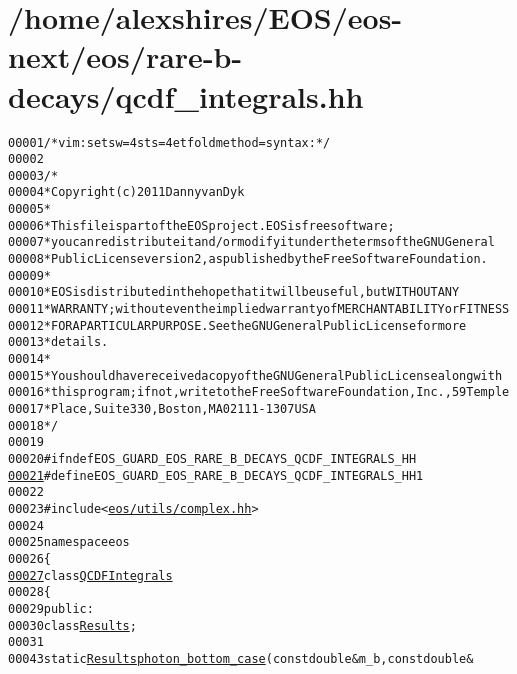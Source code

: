 \hypertarget{qcdf__integrals_8hh_source}{
\section{/home/alexshires/EOS/eos-\/next/eos/rare-\/b-\/decays/qcdf\_\-integrals.hh}
}


\begin{footnotesize}\begin{alltt}
00001 \textcolor{comment}{/* vim: set sw=4 sts=4 et foldmethod=syntax : */}
00002 
00003 \textcolor{comment}{/*}
00004 \textcolor{comment}{ * Copyright (c) 2011 Danny van Dyk}
00005 \textcolor{comment}{ *}
00006 \textcolor{comment}{ * This file is part of the EOS project. EOS is free software;}
00007 \textcolor{comment}{ * you can redistribute it and/or modify it under the terms of the GNU General}
00008 \textcolor{comment}{ * Public License version 2, as published by the Free Software Foundation.}
00009 \textcolor{comment}{ *}
00010 \textcolor{comment}{ * EOS is distributed in the hope that it will be useful, but WITHOUT ANY}
00011 \textcolor{comment}{ * WARRANTY; without even the implied warranty of MERCHANTABILITY or FITNESS}
00012 \textcolor{comment}{ * FOR A PARTICULAR PURPOSE.  See the GNU General Public License for more}
00013 \textcolor{comment}{ * details.}
00014 \textcolor{comment}{ *}
00015 \textcolor{comment}{ * You should have received a copy of the GNU General Public License along with}
00016 \textcolor{comment}{ * this program; if not, write to the Free Software Foundation, Inc., 59 Temple}
00017 \textcolor{comment}{ * Place, Suite 330, Boston, MA  02111-1307  USA}
00018 \textcolor{comment}{ */}
00019 
00020 \textcolor{preprocessor}{#ifndef EOS\_GUARD\_EOS\_RARE\_B\_DECAYS\_QCDF\_INTEGRALS\_HH}
\hypertarget{qcdf__integrals_8hh_source_l00021}{}\hyperlink{qcdf__integrals_8hh_a22714b9eea2c1c4f506ea9b45a76f43a}{00021} \textcolor{preprocessor}{}\textcolor{preprocessor}{#define EOS\_GUARD\_EOS\_RARE\_B\_DECAYS\_QCDF\_INTEGRALS\_HH 1}
00022 \textcolor{preprocessor}{}
00023 \textcolor{preprocessor}{#include <\hyperlink{complex_8hh}{eos/utils/complex.hh}>}
00024 
00025 \textcolor{keyword}{namespace }eos
00026 \{
\hypertarget{qcdf__integrals_8hh_source_l00027}{}\hyperlink{classeos_1_1QCDFIntegrals}{00027}     \textcolor{keyword}{class }\hyperlink{classeos_1_1QCDFIntegrals}{QCDFIntegrals}
00028     \{
00029         \textcolor{keyword}{public}:
00030             \textcolor{keyword}{class }\hyperlink{structeos_1_1QCDFIntegrals_1_1Results}{Results};
00031 
00043             \textcolor{keyword}{static} \hyperlink{structeos_1_1QCDFIntegrals_1_1Results}{Results} \hyperlink{classeos_1_1QCDFIntegrals_af6508bca0f6425fcefc36a75699fd505}{photon_bottom_case}(\textcolor{keyword}{const} \textcolor{keywordtype}{double} & m\_b, \textcolor{keyword}{const} \textcolor{keywordtype}{double} & 

\end{alltt}
\end{footnotesize}
